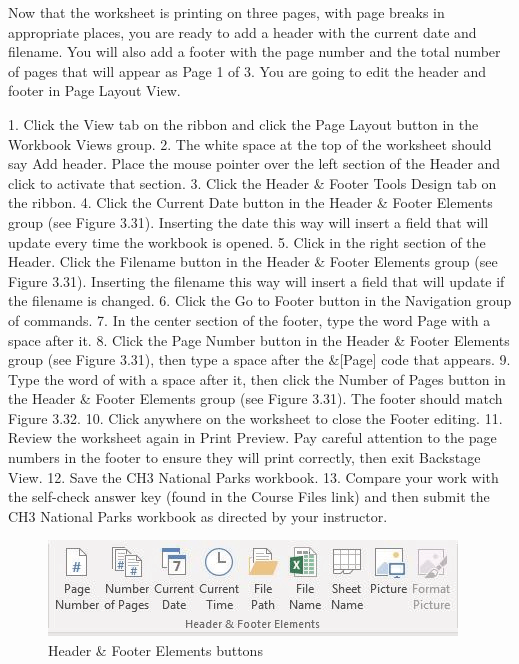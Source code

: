 Now that the worksheet is printing on three pages, with page breaks in appropriate places, you are
ready to add a header with the current date and filename. You will also add a footer with the page
number and the total number of pages that will appear as Page 1 of 3. You are going to edit the header
and footer in Page Layout View.



1. Click the View tab on the ribbon and click the Page Layout button in the Workbook Views
group.
2. The white space at the top of the worksheet should say Add header. Place the mouse pointer
over the left section of the Header and click to activate that section.
3. Click the Header \& Footer Tools Design tab on the ribbon.
4. Click the Current Date button in the Header \& Footer Elements group (see Figure 3.31).
Inserting the date this way will insert a field that will update every time the workbook is opened.
5. Click in the right section of the Header. Click the Filename button in the Header \& Footer
Elements group (see Figure 3.31). Inserting the filename this way will insert a field that will
update if the filename is changed.
6. Click the Go to Footer button in the Navigation group of commands.
7. In the center section of the footer, type the word Page with a space after it.
8. Click the Page Number button in the Header \& Footer Elements group (see Figure 3.31), then
type a space after the \&[Page] code that appears.
9. Type the word of with a space after it, then click the Number of Pages button in the Header \&
Footer Elements group (see Figure 3.31). The footer should match Figure 3.32.
10. Click anywhere on the worksheet to close the Footer editing.
11. Review the worksheet again in Print Preview. Pay careful attention to the page numbers in the
footer to ensure they will print correctly, then exit Backstage View.
12. Save the CH3 National Parks workbook.
13. Compare your work with the self-check answer key (found in the Course Files link) and then
submit the CH3 National Parks workbook as directed by your instructor.


\begin{figure}[H]
	\centering
	\includegraphics[width=\maxwidth{.95\linewidth}]{gfx/ch03_fig32}
	\caption{Header \& Footer Elements buttons}
	\label{03:fig32}
\end{figure}

